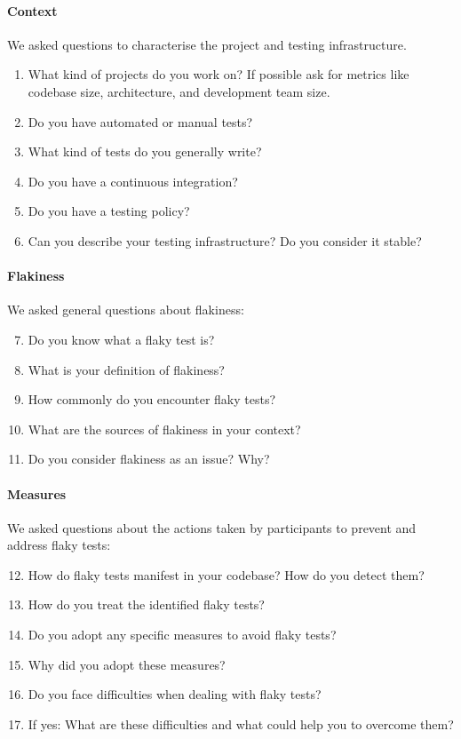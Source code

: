 \paragraph{\textbf{Context}}
We asked questions to characterise the project and testing infrastructure.
\begin{enumerate}[leftmargin=*,noitemsep,topsep=0pt]
    \item What kind of projects do you work on? If possible ask for metrics like codebase size, architecture, and development team size.
    \item Do you have automated or manual tests?
    \item What kind of tests do you generally write?
    \item Do you have a continuous integration?
    \item Do you have a testing policy?
    \item Can you describe your testing infrastructure? Do you consider it stable?
\end{enumerate}

\paragraph{\textbf{Flakiness}}
We asked general questions about flakiness:
\begin{enumerate}[leftmargin=*,noitemsep,topsep=0pt] \setcounter{enumi}{6}
    \item Do you know what a flaky test is? 
    \item What is your definition of flakiness?
    \item How commonly do you encounter flaky tests?
    \item What are the sources of flakiness in your context? 
    \item Do you consider flakiness as an issue? Why?
\end{enumerate}

\paragraph{\textbf{Measures}}
We asked questions about the actions taken by participants to prevent and address flaky tests:
\begin{enumerate}[leftmargin=*,noitemsep,topsep=0pt] \setcounter{enumi}{11}
    \item How do flaky tests manifest in your codebase? How do you detect them?
    \item How do you treat the identified flaky tests?
    \item Do you adopt any specific measures to avoid flaky tests?
    \item Why did you adopt these measures?
    \item Do you face difficulties when dealing with flaky tests? 
    \item If yes: What are these difficulties and what could help you to overcome them?
\end{enumerate}


